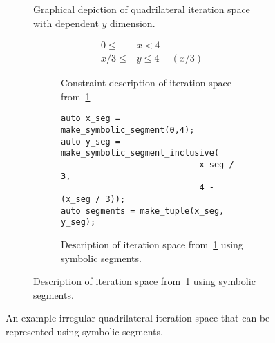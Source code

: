 \begin{figure}
\begin{subfigure}{0.4\columnwidth}
\caption{Graphical depiction of quadrilateral iteration space with dependent $y$ dimension.}\label{trapezoidIterationSpace1}
\end{subfigure}
\hspace{0.05\columnwidth}
\begin{subfigure}{0.55\columnwidth}
\begin{subfigure}{\columnwidth}
\begin{align}
	0 \leq &x < 4 \\
	x / 3 \leq &y \leq 4 - (x / 3)
\end{align}
\caption{Constraint description of iteration space from~\ref{trapezoidIterationSpace1}}\label{trapezoidConstraint1}
\end{subfigure}

\vspace{20pt}

\begin{subfigure}{\columnwidth}
\begin{lstlisting}[]
auto x_seg = make_symbolic_segment(0,4);
auto y_seg = make_symbolic_segment_inclusive(
							x_seg / 3, 
							4 - (x_seg / 3));
auto segments = make_tuple(x_seg, y_seg);
\end{lstlisting}
\caption{Description of iteration space from~\ref{trapezoidIterationSpace1} using symbolic segments.}\label{trapseg1}
\end{subfigure}
\end{subfigure}
\caption{An example irregular quadrilateral iteration space that can be represented using symbolic segments.}\label{trapezoid1}
\end{figure}



